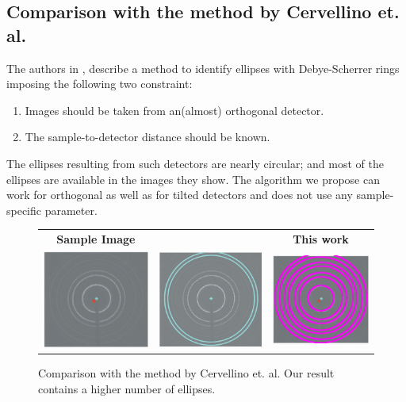 \documentclass[preprint]{iucr}              %
\newcommand\dsrs{Debye-Scherrer rings}
\begin{document}
\subsection{\textbf{Comparison with the method by Cervellino et. al.}}
\label{sec:cerv}
The authors in \cite{cervellino2006folding}, describe a method to identify ellipses with \dsrs{} imposing the following two constraint:

\begin{enumerate}
    \item Images should be taken from an(almost) orthogonal detector.
    \item The sample-to-detector distance should be known.
\end{enumerate}

The ellipses resulting from such detectors are nearly circular; and most of the ellipses are available in the images they show. The algorithm we propose can work for orthogonal as well as for tilted detectors and does not use any sample-specific parameter.

\begin{figure}
\centering
\begin{tabular}{ccc}

\textbf{Sample Image} & \textbf{\cite{cervellino2006folding}} & \textbf{This work}
\\
\includegraphics[width=.30\linewidth]{Comparisons/fold1.png}
&
\includegraphics[width=.30\linewidth]{Comparisons/fold1CervResult.png}
&
\includegraphics[width=.30\linewidth]{Comparisons/fold1OurResult.png}
\end{tabular}

\label{fig:compare_cerv}
\caption {Comparison with the method by Cervellino et. al. Our result contains a higher number of ellipses.}
\end{figure}
\end{document}
